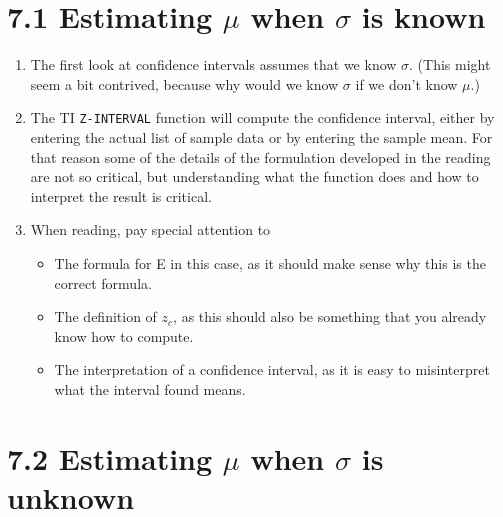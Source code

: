 \documentclass{article}
\begin{document}
\section{7.1 Estimating $\mu$ when $\sigma$ is known}

\begin{enumerate}

    \item The first look at confidence intervals assumes that we know $\sigma$.  (This might seem a bit contrived, because why would we know $\sigma$ if we don’t know $\mu$.)
    
    \item The TI \texttt{Z-INTERVAL} function will compute the confidence interval, either by entering the actual list of sample data or by entering the sample mean. For that reason some of the details of the formulation developed in the reading are not so critical, but understanding what the function does and how to interpret the result is critical.
    
    \item When reading, pay special attention to
    
        \begin{itemize}
        
            \item The formula for E in this case, as it should make sense why this is the correct formula.
            
            \item The definition of $z_c$, as this should also be something that you already know how to compute.
            
            \item The interpretation of a confidence interval, as it is easy to misinterpret what the interval found means.
            
        \end{itemize}
        
\end{enumerate}

\section{7.2 Estimating $\mu$ when $\sigma$ is unknown}
\end{document}
